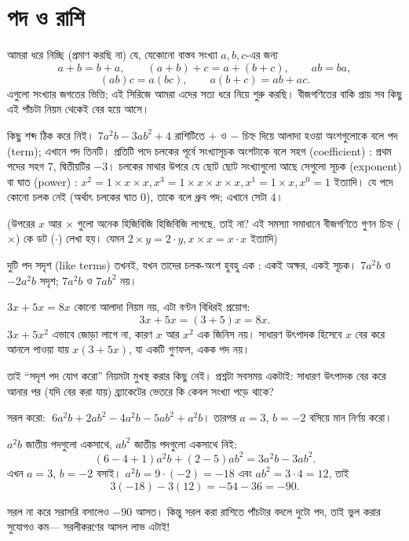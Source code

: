 \documentclass[11pt]{article}
\begin{document}
\section{পদ ও রাশি}

\begin{idea}[সংখ্যার নিয়মগুলোই বীজগণিতের নিয়ম]
আমরা ধরে নিচ্ছি (প্রমাণ করছি না) যে, যেকোনো বাস্তব সংখ্যা $a, b, c$-এর জন্য
\[
  a + b = b + a, \qquad (a+b) + c = a + (b+c), \qquad ab = ba,
\]
\[
  (ab)c = a(bc), \qquad a(b + c) = ab + ac .
\]
এগুলো সংখ্যার জগতের ভিত্তি; এই
সিরিজে আমরা এদের সত্য ধরে নিয়ে শুরু করছি। বীজগণিতের বাকি প্রায় সব কিছু এই পাঁচটা নিয়ম থেকেই বের হয়ে আসে।
\end{idea}

\noindent
কিছু শব্দ ঠিক করে নিই। $7a^2b - 3ab^2 + 4$ রাশিটিতে $+$ ও $-$ চিহ্ন দিয়ে আলাদা হওয়া অংশগুলোকে বলে পদ (term); এখানে পদ তিনটি। প্রতিটি পদে চলকের পূর্বে সংখ্যাসূচক অংশটাকে
বলে সহগ (coefficient) : প্রথম পদের সহগ $7$, দ্বিতীয়টির $-3$। চলকের মাথার উপরে যে ছোট ছোট সংখ্যাগুলো আছে সেগুলো সূচক (exponent) বা ঘাত (power) : $x^2=1\times x \times x, x^3=1\times x\times x\times x, x^1=1\times x, x^0=1$ ইত্যাদি। যে পদে কোনো চলক নেই (অর্থাৎ চলকের ঘাত $0$), তাকে বলে ধ্রুব পদ; এখানে সেটা $4$।

\noindent (উপরের $x$ আর $\times$ গুলো অনেক হিজিবিজি হিজিবিজি লাগছে, তাই না? এই সমস্যা সমাধানে বীজগণিতে গুণন চিহ্ন ($\times$) কে ডট ($\cdot$) লেখা হয়। যেমন $2\times y=2\cdot y, x\times x=x\cdot x$ ইত্যাদি)

\noindent দুটি পদ সদৃশ (like terms) তখনই, যখন তাদের চলক-অংশ হুবহু এক : একই অক্ষর, একই
সূচক। $7a^2b$ ও $-2a^2b$ সদৃশ; $7a^2b$ ও $7ab^2$ নয়।

\begin{idea}[সদৃশ পদ কেন যোগ হয়]
$3x + 5x = 8x$ কোনো আলাদা নিয়ম নয়, এটা বণ্টন বিধিরই প্রয়োগ:
\[
  3x + 5x = (3 + 5)x = 8x .
\]
$3x + 5x^2$ এভাবে জোড়া লাগে না, কারণ $x$ আর $x^2$ এক জিনিস নয়। সাধারণ উৎপাদক হিসেবে $x$ বের করে আনলে পাওয়া যায় $x(3 + 5x)$, যা একটি গুণফল, একক পদ নয়।

তাই ``সদৃশ পদ যোগ করো'' নিয়মটা মুখস্থ করার কিছু নেই। প্রশ্নটা সবসময় একটাই:
সাধারণ উৎপাদক বের করে আনার পর (যদি বের করা যায়) ব্র্যাকেটের ভেতরে কি কেবল সংখ্যা পড়ে থাকে?
\end{idea}

\begin{example}
সরল করো: $\;6a^2b + 2ab^2 - 4a^2b - 5ab^2 + a^2b$। তারপর $a = 3$, $b = -2$
বসিয়ে মান নির্ণয় করো।
\end{example}

\begin{solbox}
$a^2b$ জাতীয় পদগুলো একসাথে, $ab^2$ জাতীয় পদগুলো একসাথে নিই:
\[
  (6 - 4 + 1)a^2b + (2 - 5)ab^2 = 3a^2b - 3ab^2 .
\]
এখন $a = 3$, $b = -2$ বসাই। $a^2b = 9 \cdot (-2) = -18$ এবং
$ab^2 = 3 \cdot 4 = 12$, তাই
\[
  3(-18) - 3(12) = -54 - 36 = -90 .
\]

সরল না করে সরাসরি বসালেও $-90$ আসত। কিন্তু সরল করা রাশিতে পাঁচটার বদলে দুটো পদ,
তাই ভুল করার সুযোগও কম--- সরলীকরণের আসল লাভ এটাই!
\end{solbox}
\end{document}
